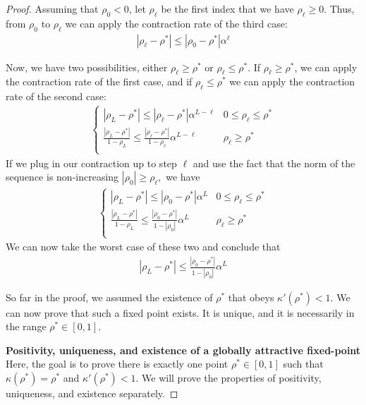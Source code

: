 \documentclass[twoside]{article}
\theoremstyle{definition}
\begin{document}
\begin{proof}
Assuming that $\rho_0 < 0$, let $\rho_\ell$ be the first index that we have $\rho_\ell \ge 0$. Thus, from $\rho_0$ to $\rho_\ell$ we can apply the contraction rate of the third case:
\begin{align*}
|\rho_\ell - \rho^*| \le |\rho_0 - \rho^*| \alpha^\ell
\end{align*}

Now, we have two possibilities, either $\rho_\ell \ge \rho^*$ or $\rho_\ell \le \rho^*$. If $\rho_\ell \ge \rho^*$, we can apply the contraction rate of the first case, and if $\rho_\ell \le \rho^*$ we can apply the contraction rate of the second case:
\begin{align*}
    \begin{cases}
|\rho_L - \rho^*| \le |\rho_\ell - \rho^*| \alpha^{L-\ell} & 0\le \rho_\ell\le \rho^*\\
\frac{|\rho_L-\rho^*|}{1-\rho_L} \le \frac{|\rho_\ell-\rho^*|}{1-\rho_\ell}\alpha^{L-\ell} & \rho_\ell\ge \rho^* \\
    \end{cases}
\end{align*}
If we plug in our contraction up to step $\ell$ and use the fact that the norm of the sequence is non-increasing $|\rho_0|\ge \rho_\ell,$ we have
\begin{align*}
    \begin{cases}
|\rho_L - \rho^*| \le |\rho_0 - \rho^*| \alpha^{L} & 0\le \rho_\ell\le \rho^*\\
\frac{|\rho_L-\rho^*|}{1-\rho_L} \le \frac{|\rho_0-\rho^*|}{1-|\rho_0|}\alpha^{L} & \rho_\ell\ge \rho^* \\
    \end{cases}
\end{align*}
We can now take the worst case of these two and conclude that
\begin{align*}
|\rho_L - \rho^*| \le \frac{|\rho_0 - \rho^*|}{1-|\rho_0|} \alpha^L
\end{align*}

So far in the proof, we assumed the existence of $\rho^*$ that obeys $\kappa'(\rho^*)<1.$ We can now prove that such a fixed point exists. It is unique, and it is necessarily in the range $\rho^*\in [0,1].$

\textbf{Positivity, uniqueness, and existence of a globally attractive fixed-point}
Here, the goal is to prove there is exactly one point $\rho^*\in[0,1]$ such that $\kappa(\rho^*) = \rho^*$ and $\kappa'(\rho^*) < 1.$ We will prove the properties of positivity, uniqueness, and existence separately.


\end{proof}
\end{document}
